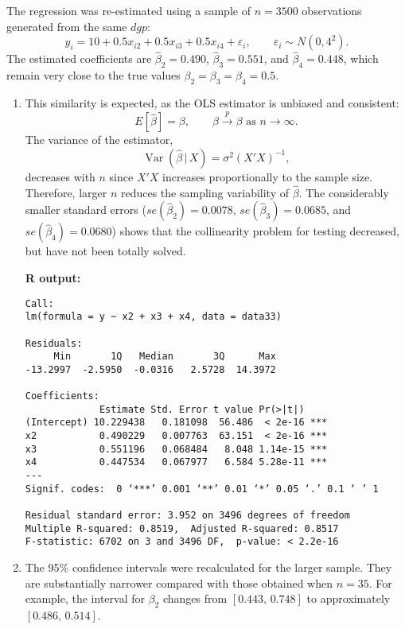 
The regression was re-estimated using a sample of $n = 3500$ observations generated from the same $dgp$:
\[
y_i = 10 + 0.5x_{i2} + 0.5x_{i3} + 0.5x_{i4} + \varepsilon_i, 
\qquad \varepsilon_i \sim N(0,4^2).
\]
The estimated coefficients are $\hat{\beta}_2 = 0.490$, $\hat{\beta}_3 = 0.551$, and $\hat{\beta}_4 = 0.448$, 
which remain very close to the true values $\beta_2 = \beta_3 = \beta_4 = 0.5$.

\begin{enumerate}[label=(\roman*)]
\item 
This similarity is expected, as the OLS estimator is unbiased and consistent:
\[
E[\hat{\beta}] = \beta, \qquad 
\hat{\beta} \xrightarrow{p} \beta \text{ as } n \to \infty.
\]
The variance of the estimator,
\[
\operatorname{Var}(\hat{\beta}\,|\,X) = \sigma^2 (X'X)^{-1},
\]
decreases with $n$ since $X'X$ increases proportionally to the sample size.  Therefore, larger $n$ reduces the sampling variability of $\hat{\beta}$.  The considerably smaller standard errors  
($se(\hat{\beta}_2) = 0.0078$, $se(\hat{\beta}_3) = 0.0685$, and $se(\hat{\beta}_4) = 0.0680$) shows that the collinearity problem for testing decreased, but have not been totally solved. 

\medskip
\textbf{R output:}
\begin{verbatim}
Call:
lm(formula = y ~ x2 + x3 + x4, data = data33)

Residuals:
     Min       1Q   Median       3Q      Max 
-13.2997  -2.5950  -0.0316   2.5728  14.3972 

Coefficients:
             Estimate Std. Error t value Pr(>|t|)    
(Intercept) 10.229438   0.181098  56.486  < 2e-16 ***
x2           0.490229   0.007763  63.151  < 2e-16 ***
x3           0.551196   0.068484   8.048 1.14e-15 ***
x4           0.447534   0.067977   6.584 5.28e-11 ***
---
Signif. codes:  0 ‘***’ 0.001 ‘**’ 0.01 ‘*’ 0.05 ‘.’ 0.1 ‘ ’ 1

Residual standard error: 3.952 on 3496 degrees of freedom
Multiple R-squared: 0.8519,  Adjusted R-squared: 0.8517 
F-statistic: 6702 on 3 and 3496 DF,  p-value: < 2.2e-16
\end{verbatim}

\item

The 95\% confidence intervals were recalculated for the larger sample.  
They are substantially narrower compared with those obtained when $n = 35$.  
For example, the interval for $\beta_2$ changes from $[0.443,\, 0.748]$ to approximately $[0.486,\, 0.514]$.  


\end{enumerate}
